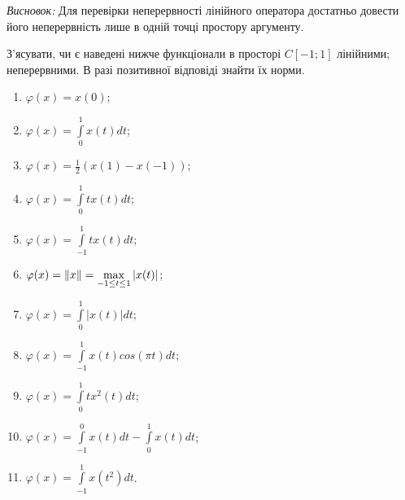 \begin{theory}
    \emph{Висновок:} Для перевірки неперервності лінійного оператора достатньо 
    довести його неперервність лише в одній точці простору аргументу.
\end{theory}

\begin{exercise}
    З'ясувати, чи є наведені нижче функціонали в просторі $C{\left[-1; 1\right]}$ лінійними; 
    неперервними. В разі позитивної відповіді знайти їх норми. 
    \begin{enumerate}[label=\ukr*)]
        \item $\varphi(x) = x(0)$;
        \item $\varphi(x) = \int\limits_0^1x(t)dt$;
        \item $\varphi(x) = \frac{1}{2}(x(1) - x(-1))$;
        \item $\varphi(x) = \int\limits_0^1tx(t)dt$;
        \item $\varphi(x) = \int\limits_{-1}^1tx(t)dt$;
        \item $\varphi(x) = \left\lVert x\right\rVert = \max\limits_{-1 \leq t \leq 1} |x(t)|$;
        \item $\varphi(x) = \int\limits_0^1|x(t)|dt$;
        \item $\varphi(x) = \int\limits_{-1}^1x(t)cos(\pi t)dt$;
        \item $\varphi(x) = \int\limits_0^1tx^2(t)dt$;
        \item $\varphi(x) = \int\limits_{-1}^0x(t)dt - \int\limits_0^1x(t)dt$;
        \item $\varphi(x) = \int\limits_{-1}^1x(t^2)dt$.
    \end{enumerate}
\end{exercise}

